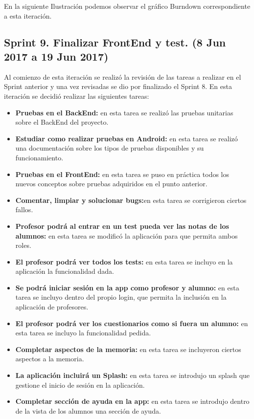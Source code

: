 En la siguiente Ilustración podemos observar el gráfico Burndown correspondiente a esta iteración.


\subsection{Sprint 9. Finalizar FrontEnd y test. (8 Jun 2017 a 19 Jun 2017)}

Al comienzo de esta iteración se realizó la revisión de las tareas a realizar en el Sprint anterior y una vez revisadas se dio por finalizado el Sprint 8. 
En esta iteración se decidió realizar las siguientes tareas:

\begin{itemize}

	\item \textbf{Pruebas en el BackEnd:} en esta tarea se realizó las pruebas unitarias sobre el BackEnd del proyecto.
	
	\item \textbf{Estudiar como realizar pruebas en Android:} en esta tarea se realizó una documentación sobre los tipos de pruebas disponibles y su funcionamiento.
	
	\item \textbf{Pruebas en el FrontEnd:} en esta tarea se puso en práctica todos los nuevos conceptos sobre pruebas adquiridos en el punto anterior.
	
	\item \textbf{Comentar, limpiar y solucionar bugs:}en esta tarea se corrigieron ciertos fallos.
	
	\item \textbf{Profesor podrá al entrar en un test pueda ver las notas de los alumnos:} en esta tarea se modificó la aplicación para que permita ambos roles.
	
	\item \textbf{El profesor podrá ver todos los tests:} en esta tarea se incluyo en la aplicación la funcionalidad dada.	
	
	\item \textbf{Se podrá iniciar sesión en la app como profesor y alumno:} en esta tarea se incluyo dentro del propio login, que permita la inclusión en la aplicación de profesores.
	
	\item \textbf{El profesor podrá ver los cuestionarios como si fuera un alumno:} en esta tarea se incluyo la funcionalidad pedida.
	
	\item \textbf{Completar aspectos de la memoria:} en esta tarea se incluyeron ciertos aspectos a la memoria.
	
	\item \textbf{La aplicación incluirá un Splash:} en esta tarea se introdujo un splash que gestione el inicio de sesión en la aplicación.
	
	\item \textbf{Completar sección de ayuda en la app:} en esta tarea se introdujo dentro de la vista de los alumnos una sección de ayuda.


\end{itemize}

